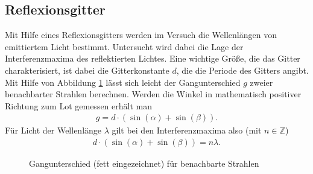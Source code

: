 \subsection{Reflexionsgitter}
Mit Hilfe eines Reflexionsgitters werden im Versuch die Wellenlängen von emittiertem Licht bestimmt. Untersucht wird dabei die Lage der Interferenzmaxima des reflektierten Lichtes. Eine wichtige Größe, die das Gitter charakterisiert, ist dabei die Gitterkonstante $d$, die die Periode des Gitters angibt. Mit Hilfe von Abbildung \ref{Gangunterschied} lässt sich leicht der Gangunterschied $g$ zweier benachbarter Strahlen berechnen. Werden die Winkel in mathematisch positiver Richtung zum Lot gemessen erhält man
\begin{align*}
  g=d \cdot (\sin(\alpha)+\sin(\beta)).
\end{align*} 
Für Licht der Wellenlänge $\lambda$ gilt bei den Interferenzmaxima also (mit $n \in \mathbb{Z}$)
\begin{align}
  d \cdot (\sin(\alpha)+\sin(\beta)) = n\lambda.
\end{align}
\begin{figure}[h]
  \centering
  \caption{Gangunterschied (fett eingezeichnet) für benachbarte Strahlen}
  \label{Gangunterschied}
\end{figure}

